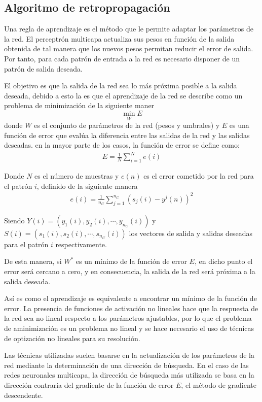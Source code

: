 \subsection{Algoritmo de retropropagación}
Una regla de aprendizaje es el método que le permite adaptar los parámetros de la red. El perceptrón multicapa actualiza sus pesos en función de la salida obtenida de tal manera que los nuevos pesos permitan reducir el error de salida. Por tanto, para cada patrón de entrada a la red es necesario disponer de un patrón de salida deseada.

El objetivo es que la salida de la red sea lo más próxima posible a la salida deseada, debido a esto la es que el aprendizaje de la red se describe como un problema de minimización de la siguiente maner $$ \min_{W} E $$ donde $W$ es el conjunto de parámetros de la red (pesos y umbrales) y $E$ es una función de error que evalúa la diferencia entre las salidas de la red y las salidas deseadas. en la mayor parte de los casos, la función de error se define como:
\begin{eqnarray}
	E = \frac{1}{N}\sum^{N}_{i = 1} e(i)
\end{eqnarray}

Donde $N$ es el número de muestras y $e(n)$ es el error cometido por la red para el patrón $i$, definido de la siguiente manera
\begin{eqnarray}
	e(i) = \frac{1}{n_{C}}\sum^{n_{C}}_{j = 1} (s_{j}(i) - y^{j}(n))^2\label{eq:error_patron}
\end{eqnarray}

Siendo $Y(i) = (y_{1}(i), y_{2}(i), \cdots, y_{n_{C}}(i))$ y $S(i) = (s_{1}(i), s_{2}(i), \cdots, s_{n_{C}}(i))$ los vectores de salida y salidas deseadas para el patrón $i$ respectivamente.

De esta manera, si $W^{*}$ es un mínimo de la función de error $E$, en dicho punto el error será cercano a cero, y en consecuencia, la salida de la red será próxima a la salida deseada.

Así es como el aprendizaje es equivalente a encontrar un mínimo de la función de error. La presencia de funciones de activación no lineales hace que la respuesta de la red sea no lineal respecto a los parámetros ajustables, por lo que el problema de aminimización es un problema no lineal y se hace necesario el uso de técnicas de optización no lineales para su resolución.

Las técnicas utilizadas suelen basarse en la actualización de los parámetros de la red mediante la determinación de una dirección de búsqueda. En el caso de las redes neuronales multicapa, la dirección de búsqueda más utilizada se basa en la dirección contraria del gradiente de la función de error $E$, el método de gradiente descendente.

